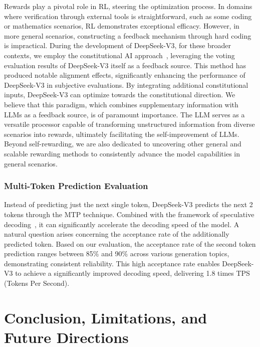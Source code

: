 \documentclass[11pt, a4paper, logo, copyright, nonumbering]{deepseek}
\newcommand{\dsviii}{DeepSeek-V3}
\begin{document}
\begin{CJK*}{UTF8}{gbsn}
Rewards play a pivotal role in RL, steering the optimization process. 
In domains where verification through external tools is straightforward, such as some coding or mathematics scenarios, RL demonstrates exceptional efficacy.
However, in more general scenarios, constructing a feedback mechanism through hard coding is impractical. 
During the development of \dsviii{}, for these broader contexts, we employ the constitutional AI approach~\citep{bai2022constitutional}, leveraging the voting evaluation results of \dsviii{} itself as a feedback source. 
This method has produced notable alignment effects, significantly enhancing the performance of \dsviii{} in subjective evaluations. 
By integrating additional constitutional inputs, \dsviii{} can optimize towards the constitutional direction. 
We believe that this paradigm, which combines supplementary information with LLMs as a feedback source, is of paramount importance. 
The LLM serves as a versatile processor capable of transforming unstructured information from diverse scenarios into rewards, ultimately facilitating the self-improvement of LLMs. 
Beyond self-rewarding, we are also dedicated to uncovering other general and scalable rewarding methods to consistently advance the model capabilities in general scenarios.

\subsubsection{Multi-Token Prediction Evaluation} 

Instead of predicting just the next single token, \dsviii{} predicts the next 2 tokens through the MTP technique. 
Combined with the framework of speculative decoding~\citep{speculative_google,speculative_xhm}, it can significantly accelerate the decoding speed of the model. 
A natural question arises concerning the acceptance rate of the additionally predicted token. 
Based on our evaluation, the acceptance rate of the second token prediction ranges between 85\% and 90\% across various generation topics, demonstrating consistent reliability. 
This high acceptance rate enables \dsviii{} to achieve a significantly improved decoding speed, delivering 1.8 times TPS (Tokens Per Second).

\section{Conclusion, Limitations, and Future Directions}
\label{sec:conclusion}


\end{CJK*}
\end{document}
